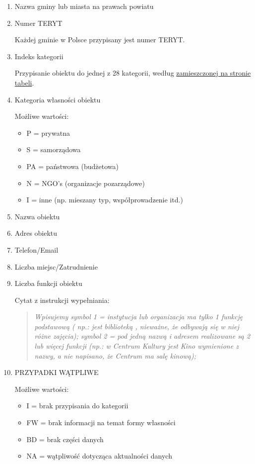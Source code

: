 \documentclass[a4 122pt]{article}
\begin{document}
			\begin{enumerate}
				\item{Nazwa gminy lub miasta na prawach powiatu}
				\item{Numer TERYT}
				
					Każdej gminie w Polsce przypisany jest numer TERYT. 
					
				\item{Indeks kategorii}
				
					Przypisanie obiektu do jednej z 28 kategorii, według \href{http://ozkultura.pl/node/1800}{zamieszczonej na stronie tabeli}.
					
				\item{Kategoria własności obiektu}
					
					Możliwe wartości:
					\begin{itemize}
						\item P = prywatna
						\item S = samorządowa
						\item PA = państwowa (budżetowa)
						\item N = NGO's (organizacje pozarządowe)
						\item I = inne (np. mieszany typ, współprowadzenie itd.)
					\end{itemize}
					
				\item{Nazwa obiektu}
				\item{Adres obiektu}
				\item{Telefon/Email}
				\item{Liczba miejsc/Zatrudnienie}
				\item{Liczba funkcji obiektu}
				
					Cytat z instrukcji wypełniania:
					
					\begin{quote}
					\textit{Wpisujemy symbol 1 = instytucja lub organizacja ma tylko 1 funkcję podstawową ( np.: jest biblioteką , nieważne, że odbywają się w niej różne zajęcia); symbol 2 = pod jedną nazwą i adresem realizowane są 2 lub więcej funkcji (np.: w Centrum Kultury jest Kino wymienione z nazwy, a nie napisano, że Centrum ma salę kinową);}
					\end{quote}
				
				\item{PRZYPADKI WĄTPLIWE}
				
					Możliwe wartości:
					\begin{itemize}
						\item I = brak przypisania do kategorii
						\item FW = brak informacji na temat formy własności
						\item BD = brak części danych
						\item NA = wątpliwość dotycząca aktualności danych
					\end{itemize}
					
			\end{enumerate}
	
\end{document}
